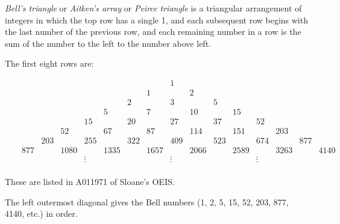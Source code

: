 \documentclass[12pt]{article}
\begin{document}
{\em Bell's triangle} or {\em Aitken's array} or {\em Peirce triangle} is a triangular arrangement of integers in which the top row has a single 1, and each subsequent row begins with the last number of the previous row, and each remaining number in a row is the sum of the number to the left to the number above left.

The first eight rows are:

$$\begin{array}{cccccccccccccccccc}
& & & & & & & & & 1 & & & & & & & &\\
& & & & & & & & 1 & & 2 & & & & & & &\\
& & & & & & & 2 & & 3 & & 5 & & & & & &\\
& & & & & & 5 & & 7 & & 10 & & 15 & & & & &\\
& & & & & 15 & & 20 & & 27 & & 37 & & 52 & & & &\\
& & & & 52 & & 67 & & 87 & & 114 & & 151 & & 203 & & &\\
& & & 203 & & 255 & & 322 & & 409 & & 523 & & 674 & & 877 & &\\
& & 877 & & 1080 & & 1335 & & 1657 & & 2066 & & 2589 & & 3263 & & 4140 &\\
& & & & &\vdots & & & & \vdots & & & & \vdots& & & & \\
\end{array}$$

These are listed in A011971 of Sloane's OEIS.

The left outermost diagonal gives the Bell numbers (1, 2, 5, 15, 52, 203, 877, 4140, etc.) in order.
\end{document}
